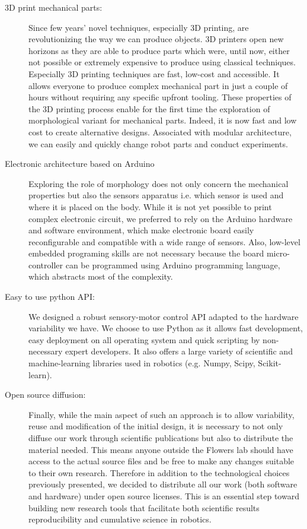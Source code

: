 \begin{description}
    \item[3D print mechanical parts:] Since few years’ novel techniques, especially 3D printing, are revolutionizing the way we can produce objects. 3D printers open new horizons as they are able to produce parts which were, until now, either not possible or extremely expensive to produce using classical techniques. Especially 3D printing techniques are fast, low-cost and accessible. It allows everyone to produce complex mechanical part in just a couple of hours without requiring any specific upfront tooling.
    These properties of the 3D printing process enable for the first time the exploration of morphological variant for mechanical parts. Indeed, it is now fast and low cost to create alternative designs. Associated with modular architecture, we can easily and quickly change robot parts and conduct experiments.
    \item[Electronic architecture based on Arduino] Exploring the role of morphology does not only concern the mechanical properties but also the sensors apparatus i.e. which sensor is used and where it is placed on the body. While it is not yet possible to print complex electronic circuit, we preferred to rely on the Arduino hardware and software environment, which make electronic board easily reconfigurable and compatible with a wide range of sensors. Also, low-level embedded programing skills are not necessary because the board micro-controller can be programmed using Arduino programming language, which abstracts most of the complexity.
    \item[Easy to use python API:] We designed a robust sensory-motor control API adapted to the hardware variability we have. We choose to use Python as it allows fast development, easy deployment on all operating system and quick scripting by non-necessary expert developers. It also offers a large variety of scientific and machine-learning libraries used in robotics (e.g. Numpy, Scipy, Scikit-learn).
    \item[Open source diffusion:] Finally, while the main aspect of such an approach is to allow variability, reuse and modification of the initial design, it is necessary to not only diffuse our work through scientific publications but also to distribute the material needed. This means anyone outside the Flowers lab should have access to the actual source files and be free to make any changes suitable to their own research. Therefore in addition to the technological choices previously presented, we decided to distribute all our work (both software and hardware) under open source licenses. This is an essential step toward building new research tools that facilitate both scientific results reproducibility and cumulative science in robotics.

\end{description}

